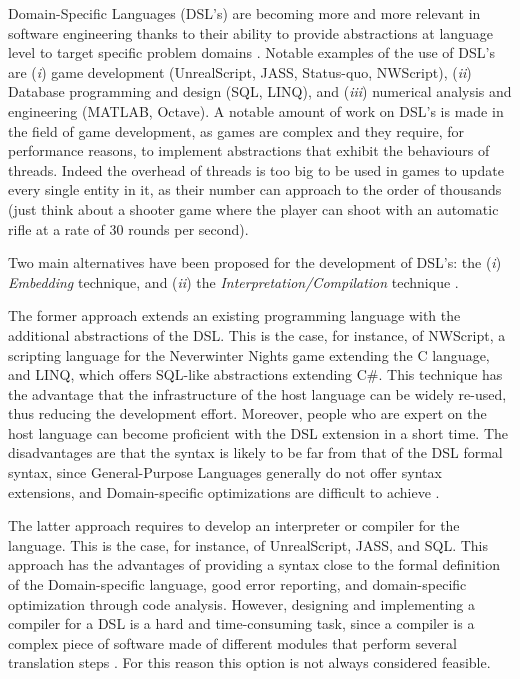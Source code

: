 Domain-Specific Languages (DSL's) are becoming more and more relevant in software engineering thanks to their ability to provide abstractions at language level to target specific problem domains \cite{van2000domain, voelter2013dsl}. Notable examples of the use of DSL's are (\textit{i}) game development (UnrealScript, JASS, Status-quo, NWScript), (\textit{ii}) Database programming and design (SQL, LINQ), and (\textit{iii}) numerical analysis and engineering (MATLAB, Octave). A notable amount of work on DSL's is made in the field of game development, as games are complex and they require, for performance reasons, to implement abstractions that exhibit the behaviours of threads. Indeed the overhead of threads is too big to be used in games to update every single entity in it, as their number can approach to the order of thousands (just think about a shooter game where the player can shoot with an automatic rifle at a rate of 30 rounds per second).

Two main alternatives have been proposed for the development of DSL's: the (\textit{i}) \textit{Embedding} technique, and (\textit{ii}) the \textit{Interpretation/Compilation} technique \cite{mernik2005and}. 

The former approach extends an existing programming language with the additional abstractions of the DSL. This is the case, for instance, of NWScript, a scripting language for the Neverwinter Nights game extending the C language, and LINQ, which offers SQL-like abstractions extending C\#. This technique has the advantage that the infrastructure of the host language can be widely re-used, thus reducing the development effort. Moreover, people who are expert on the host language can become proficient with the DSL extension in a short time. The disadvantages are that the syntax is likely to be far from that of the DSL formal syntax, since General-Purpose Languages generally do not offer syntax extensions, and Domain-specific optimizations are difficult to achieve \cite{kamin1998research, sloane2002post}.

The latter approach requires to develop an interpreter or compiler for the language. This is the case, for instance, of UnrealScript, JASS, and SQL. This approach has the advantages of providing a syntax close to the formal definition of the Domain-specific language, good error reporting, and domain-specific optimization through code analysis. However, designing and implementing a compiler for a DSL is a hard and time-consuming task, since a compiler is a complex piece of software made of different modules that perform several translation steps \cite{aho1986compilers}. For this reason this option is not always considered feasible.

